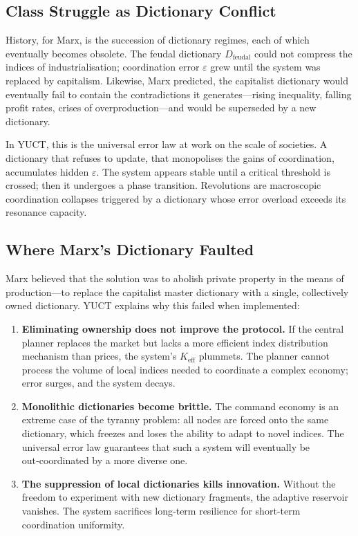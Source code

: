 \documentclass[12pt,a4paper]{article}
\newcommand{\Keff}{K_{\mathrm{eff}}}
\begin{document}
	\subsection{Class Struggle as Dictionary Conflict}
	
	History, for Marx, is the succession of dictionary regimes, each of which eventually becomes obsolete. The feudal dictionary \(D_{\text{feudal}}\) could not compress the indices of industrialisation; coordination error \(\varepsilon\) grew until the system was replaced by capitalism. Likewise, Marx predicted, the capitalist dictionary would eventually fail to contain the contradictions it generates—rising inequality, falling profit rates, crises of overproduction—and would be superseded by a new dictionary.
	
	In YUCT, this is the universal error law at work on the scale of societies. A dictionary that refuses to update, that monopolises the gains of coordination, accumulates hidden \(\varepsilon\). The system appears stable until a critical threshold is crossed; then it undergoes a phase transition. Revolutions are macroscopic coordination collapses triggered by a dictionary whose error overload exceeds its resonance capacity.
	
	\subsection{Where Marx’s Dictionary Faulted}
	
	Marx believed that the solution was to abolish private property in the means of production—to replace the capitalist master dictionary with a single, collectively owned dictionary. YUCT explains why this failed when implemented:
	
	\begin{enumerate}[leftmargin=*]
		\item \textbf{Eliminating ownership does not improve the protocol.} If the central planner replaces the market but lacks a more efficient index distribution mechanism than prices, the system’s \(\Keff\) plummets. The planner cannot process the volume of local indices needed to coordinate a complex economy; error surges, and the system decays.
		\item \textbf{Monolithic dictionaries become brittle.} The command economy is an extreme case of the tyranny problem: all nodes are forced onto the same dictionary, which freezes and loses the ability to adapt to novel indices. The universal error law guarantees that such a system will eventually be out‑coordinated by a more diverse one.
		\item \textbf{The suppression of local dictionaries kills innovation.} Without the freedom to experiment with new dictionary fragments, the adaptive reservoir vanishes. The system sacrifices long‑term resilience for short‑term coordination uniformity.
	\end{enumerate}
	
\end{document}
